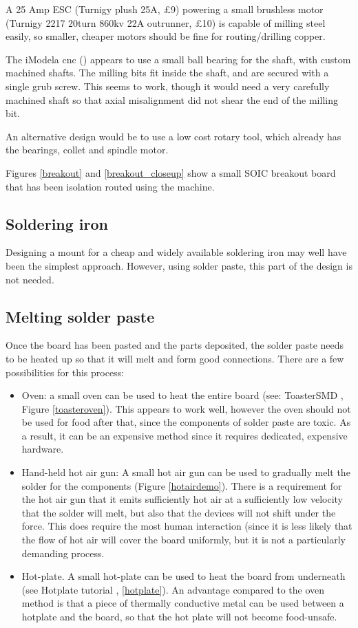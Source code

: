 A 25 Amp ESC (Turnigy plush 25A, \pounds 9) powering a small brushless motor (Turnigy 2217 20turn 860kv 22A outrunner, \pounds 10) is capable of milling
steel easily, so smaller, cheaper motors should be fine for routing/drilling copper.

The iModela cnc (\cite{imodela}) appears to use a small ball bearing for the shaft, with custom machined shafts. The milling bits fit inside the shaft, and
are secured with a single grub screw. This seems to work, though it would need a very carefully machined shaft so that axial misalignment
did not shear the end of the milling bit.

An alternative design would be to use a low cost rotary tool, which already has the bearings, collet and spindle motor. 

Figures \ref{breakout} and \ref{breakout_closeup} show a small SOIC breakout board that has been isolation routed using the machine. 

\subsection{Soldering iron}
Designing a mount for a cheap and widely available soldering iron may well have been the simplest approach. However, using solder paste, 
this part of the design is not needed.

\subsection{Melting solder paste}
Once the board has been pasted and the parts deposited, the solder paste needs to be heated up so that it will melt and form good connections.
There are a few possibilities for this process:

\begin{itemize} %
	\item	Oven: a small oven can be used to heat the entire board (see: ToasterSMD \cite{toastersmd}, Figure \ref{toasteroven}). This appears to
			work well, however the oven should not be used for food after that, since the components of solder paste are toxic. As a result,
			it can be an expensive method since it requires dedicated, expensive hardware.
	\item	Hand-held hot air gun: A small hot air gun can be used to gradually melt the solder for the components (Figure \ref{hotairdemo}). There is a requirement
			for the hot air gun that it emits sufficiently hot air at a sufficiently low velocity that the solder will melt, but also that
			the devices will not shift under the force. 
			This does require the most human interaction (since it is less likely that the flow of hot air will cover the board uniformly, but it
			is not a particularly demanding process.
	\item	Hot-plate. A small hot-plate can be used to heat the board from underneath (see Hotplate tutorial \cite{hotplate}, \ref{hotplate}).
			An advantage compared to the oven method is that a piece of thermally conductive metal can be used between a hotplate and the board, so
			that the hot plate will not become food-unsafe. 
\end{itemize}
		
